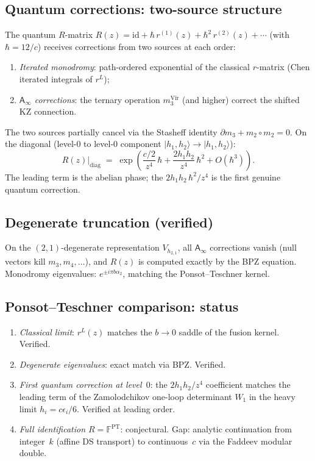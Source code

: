 \documentclass[11pt]{article}
\newcommand{\Ainf}{\mathsf{A}_{\infty}}
\newcommand{\id}{\mathrm{id}}
\begin{document}
\subsection*{Quantum corrections: two-source structure}

The quantum $R$-matrix $R(z) = \id + \hbar\,r^{(1)}(z)
+ \hbar^2\,r^{(2)}(z) + \cdots$ (with $\hbar = 12/c$) receives
corrections from two sources at each order:
\begin{enumerate}[label=(\roman*)]
\item \emph{Iterated monodromy}: path-ordered exponential of the
  classical $r$-matrix (Chen iterated integrals of $r^L$);
\item \emph{$\Ainf$ corrections}: the ternary operation
  $m_3^{\mathrm{Vir}}$ (and higher) correct the shifted KZ
  connection.
\end{enumerate}
The two sources partially cancel via the Stasheff identity
$\partial m_3 + m_2 \circ m_2 = 0$.  On the diagonal
(level-$0$ to level-$0$ component
$|h_1,h_2\rangle \to |h_1,h_2\rangle$):
\begin{equation}\label{eq:R-level0-stable}
R(z)\big|_{\mathrm{diag}}
\;=\;
\exp\!\left(
  \frac{c/2}{z^4}\,\hbar
  + \frac{2h_1 h_2}{z^4}\,\hbar^2
  + O(\hbar^3)
\right).
\end{equation}
The leading term is the abelian phase; the $2h_1 h_2\,\hbar^2/z^4$
is the first genuine quantum correction.

\subsection*{Degenerate truncation (verified)}

On the $(2,1)$-degenerate representation $V_{h_{2,1}}$, all $\Ainf$
corrections vanish (null vectors kill $m_3, m_4, \ldots$), and $R(z)$
is computed exactly by the BPZ equation.  Monodromy eigenvalues:
$e^{\pm i\pi b\alpha_2}$, matching the Ponsot--Teschner kernel.

\subsection*{Ponsot--Teschner comparison: status}

\begin{enumerate}[label=(\arabic*)]
\item \emph{Classical limit}: $r^L(z)$ matches the $b \to 0$ saddle
  of the fusion kernel.  Verified.
\item \emph{Degenerate eigenvalues}: exact match via BPZ.  Verified.
\item \emph{First quantum correction at level~$0$}: the $2h_1 h_2/z^4$
  coefficient matches the leading term of the Zamolodchikov one-loop
  determinant $W_1$ in the heavy limit $h_i = c\epsilon_i/6$.
  Verified at leading order.
\item \emph{Full identification $R = \mathbb{F}^{\mathrm{PT}}$}:
  conjectural.  Gap: analytic continuation from integer~$k$ (affine
  DS transport) to continuous~$c$ via the Faddeev modular double.
\end{enumerate}
\end{document}
